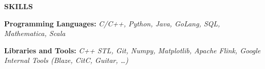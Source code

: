 \documentclass[letterpaper,11pt]{article}
\newcommand{\resheading}[1]{{\large \colorbox{mygrey}{\begin{minipage}{\linewidth}{\textbf{#1 \vphantom{p\^{E}}}}\end{minipage}}}}
\begin{document}
\resheading{SKILLS}
\begin{description}
	\item \footnotesize \textbf{Programming Languages:} \textit{C/C++, Python, Java, GoLang,  SQL, Mathematica, Scala}
	\item \footnotesize \textbf{Libraries and Tools:} \textit{C++ STL, Git, Numpy, Matplotlib, Apache Flink, Google Internal Tools (Blaze, CitC, Guitar, \dots)}
\end{description}

	

\end{document}
